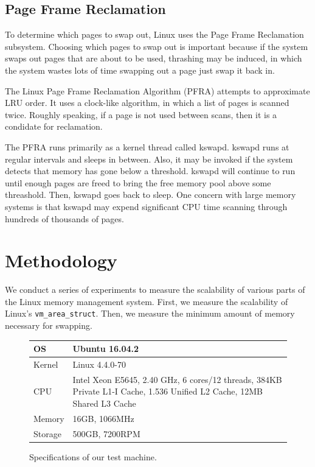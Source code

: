 \documentclass[twocolumn,11pt]{article}
\begin{document}
\subsection{Page Frame Reclamation}

To determine which pages to swap out, Linux uses the Page Frame Reclamation
subsystem. Choosing which pages to swap out is important because if the system
swaps out pages that are about to be used, thrashing may be induced, in which
the system wastes lots of time swapping out a page just swap it back in.

The Linux Page Frame Reclamation Algorithm (PFRA) attempts to approximate LRU
order. It uses a clock-like algorithm, in which a list of pages is scanned
twice. Roughly speaking, if a page is not used between scans, then it is a
condidate for reclamation.

The PFRA runs primarily as a kernel thread called kswapd. kswapd runs at regular
intervals and sleeps in between. Also, it may be invoked if the system detects
that memory has gone below a threshold. kswapd will continue to run until enough
pages are freed to bring the free memory pool above some threashold. Then,
kswapd goes back to sleep.  One concern with large memory systems is that kswapd
may expend significant CPU time scanning through hundreds of thousands of pages.

\section{Methodology}

We conduct a series of experiments to measure the scalability of various parts
of the Linux memory management system.  First, we measure the scalability of
Linux's \texttt{vm\_area\_struct}. Then, we measure the minimum amount of memory
necessary for swapping.

\begin{figure}
\centering
\begin{tabular}{|l|p{5cm}|} \hline
OS & Ubuntu 16.04.2 \\ \hline
Kernel & Linux 4.4.0-70 \\ \hline
CPU & Intel Xeon E5645, 2.40 GHz, 6 cores/12 threads, 384KB Private L1-I Cache,
1.536 Unified L2 Cache, 12MB Shared L3 Cache \\ \hline
Memory & 16GB, 1066MHz \\ \hline
Storage & 500GB, 7200RPM \\
\hline
\end{tabular}
\caption{Specifications of our test machine.  \label{fig:specs}}
\end{figure}
\end{document}
